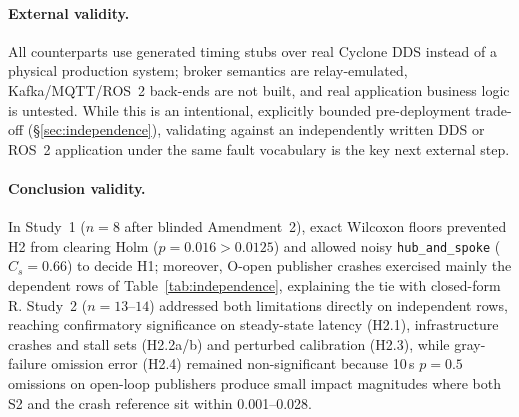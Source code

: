 \paragraph{External validity.} All counterparts use generated timing stubs over real Cyclone DDS instead of a physical production system; broker semantics are relay-emulated, Kafka/MQTT/ROS~2 back-ends are not built, and real application business logic is untested. While this is an intentional, explicitly bounded pre-deployment trade-off (\S\ref{sec:independence}), validating against an independently written DDS or ROS~2 application under the same fault vocabulary is the key next external step.

\paragraph{Conclusion validity.} In Study~1 ($n = 8$ after blinded Amendment~2), exact Wilcoxon floors prevented H2 from clearing Holm ($p = 0.016 > 0.0125$) and allowed noisy \texttt{hub\_and\_spoke} ($C_s = 0.66$) to decide H1; moreover, O-open publisher crashes exercised mainly the dependent rows of Table~\ref{tab:independence}, explaining the tie with closed-form R. Study~2 ($n = 13$--$14$) addressed both limitations directly on independent rows, reaching confirmatory significance on steady-state latency (H2.1), infrastructure crashes and stall sets (H2.2a/b) and perturbed calibration (H2.3), while gray-failure omission error (H2.4) remained non-significant because 10\,s $p = 0.5$ omissions on open-loop publishers produce small impact magnitudes where both S2 and the crash reference sit within 0.001--0.028.
